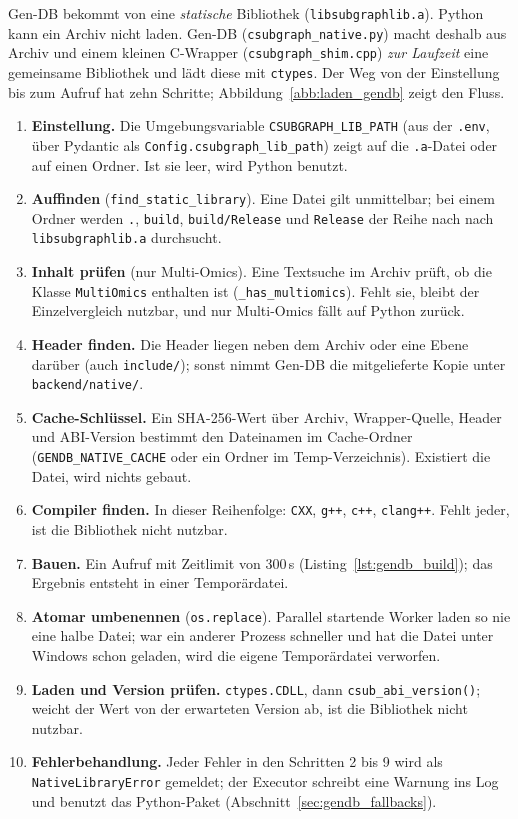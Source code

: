 Gen-DB bekommt von  eine \emph{statische} Bibliothek (\texttt{libsubgraphlib.a}). Python kann ein Archiv nicht laden. Gen-DB (\texttt{csubgraph\_native.py}) macht deshalb aus Archiv und einem kleinen C-Wrapper (\texttt{csubgraph\_shim.cpp}) \emph{zur Laufzeit} eine gemeinsame Bibliothek und lädt diese mit \texttt{ctypes}. Der Weg von der Einstellung bis zum Aufruf hat zehn Schritte; Abbildung~\ref{abb:laden_gendb} zeigt den Fluss.

\begin{enumerate}
	\item \textbf{Einstellung.} Die Umgebungsvariable \texttt{CSUBGRAPH\_LIB\_PATH} (aus der \texttt{.env}, über Pydantic als \texttt{Config.csubgraph\_lib\_path}) zeigt auf die \texttt{.a}-Datei oder auf einen Ordner. Ist sie leer, wird Python benutzt.
	\item \textbf{Auffinden} (\texttt{find\_static\_library}). Eine Datei gilt unmittelbar; bei einem Ordner werden \texttt{.}, \texttt{build}, \texttt{build/Release} und \texttt{Release} der Reihe nach nach \texttt{libsubgraphlib.a} durchsucht.
	\item \textbf{Inhalt prüfen} (nur Multi-Omics). Eine Textsuche im Archiv prüft, ob die Klasse \texttt{MultiOmics} enthalten ist (\texttt{\_has\_multiomics}). Fehlt sie, bleibt der Einzelvergleich nutzbar, und nur Multi-Omics fällt auf Python zurück.
	\item \textbf{Header finden.} Die Header liegen neben dem Archiv oder eine Ebene darüber (auch \texttt{include/}); sonst nimmt Gen-DB die mitgelieferte Kopie unter \texttt{backend/native/}.
	\item \textbf{Cache-Schlüssel.} Ein SHA-256-Wert über Archiv, Wrapper-Quelle, Header und ABI-Version bestimmt den Dateinamen im Cache-Ordner (\texttt{GENDB\_NATIVE\_CACHE} oder ein Ordner im Temp-Verzeichnis). Existiert die Datei, wird nichts gebaut.
	\item \textbf{Compiler finden.} In dieser Reihenfolge: \texttt{CXX}, \texttt{g++}, \texttt{c++}, \texttt{clang++}. Fehlt jeder, ist die Bibliothek nicht nutzbar.
	\item \textbf{Bauen.} Ein Aufruf mit Zeitlimit von $300$\,s (Listing~\ref{lst:gendb_build}); das Ergebnis entsteht in einer Temporärdatei.
	\item \textbf{Atomar umbenennen} (\texttt{os.replace}). Parallel startende Worker laden so nie eine halbe Datei; war ein anderer Prozess schneller und hat die Datei unter Windows schon geladen, wird die eigene Temporärdatei verworfen.
	\item \textbf{Laden und Version prüfen.} \texttt{ctypes.CDLL}, dann \texttt{csub\_abi\_version()}; weicht der Wert von der erwarteten Version ab, ist die Bibliothek nicht nutzbar.
	\item \textbf{Fehlerbehandlung.} Jeder Fehler in den Schritten 2 bis 9 wird als \texttt{NativeLibraryError} gemeldet; der Executor schreibt eine Warnung ins Log und benutzt das Python-Paket (Abschnitt~\ref{sec:gendb_fallbacks}).
\end{enumerate}


